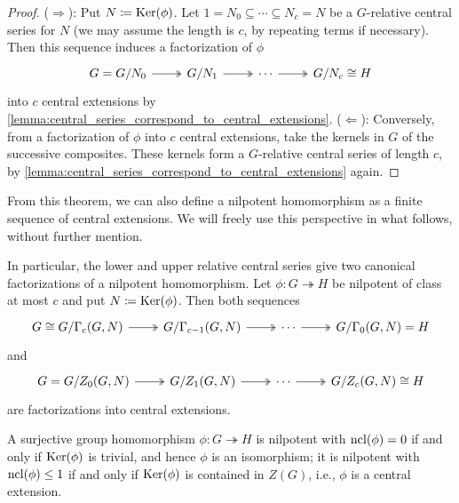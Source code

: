 \begin{proof}
($\Rightarrow$): Put $N\coloneqq\operatorname{Ker}(\phi)$. Let $1= N_{0}\subseteq\cdots\subseteq N_{c}=N$ be a $G$-relative central
series for $N$ (we may assume the length is $c$, by repeating terms if necessary). Then this sequence induces a factorization of $\phi$
\[\begin{tikzcd}
G=G/N_{0} \arrow[two heads]{r} &
G/N_{1} \arrow[two heads]{r} &
\cdots \arrow[two heads]{r} &
G/N_{c}\cong H
\end{tikzcd}\]
into $c$ central extensions by \cref{lemma:central_series_correspond_to_central_extensions}.
($\Leftarrow$): Conversely, from a factorization of $\phi$ into $c$ central extensions, take the kernels in $G$ of the successive composites. These kernels form a $G$-relative central series of length $c$, by \cref{lemma:central_series_correspond_to_central_extensions} again.
\end{proof}

From this theorem, we can also define a nilpotent homomorphism as a finite sequence of central extensions.
We will freely use this perspective in what follows, without further mention.

In particular, the lower and upper relative central series give two canonical factorizations of a nilpotent homomorphism. Let $\phi\colon G\twoheadrightarrow H$ be nilpotent of class at most $c$ and put $N\coloneqq\operatorname{Ker}(\phi)$. Then both sequences
\[\begin{tikzcd}
    G\cong G/\relLCS_{c}(G,N) \arrow[two heads]{r} &
    G/\relLCS_{c-1}(G,N) \arrow[two heads]{r} &
    \cdots \arrow[two heads]{r} &
    G/\relLCS_{0}(G,N)= H
\end{tikzcd}\]
and
\[\begin{tikzcd}
    G=G/Z_0(G, N) \arrow[two heads]{r} &
    G/ Z_{1}(G, N) \arrow[two heads]{r} &
    \cdots \arrow[two heads]{r} &
    G/Z_{c}(G, N)\cong H
\end{tikzcd}\]
are factorizations into central extensions.

\begin{eg}
    A surjective group homomorphism $\phi\colon G \twoheadrightarrow H$ is nilpotent with $\operatorname{ncl}(\phi)=0$ if and only if $\operatorname{Ker}(\phi)$ is trivial, and hence $\phi$ is an isomorphism; it is nilpotent with $\operatorname{ncl}(\phi)\leq1$ if and only if $\operatorname{Ker}(\phi)$ is contained in $Z(G)$, i.e., $\phi$ is a central extension.
\end{eg}


